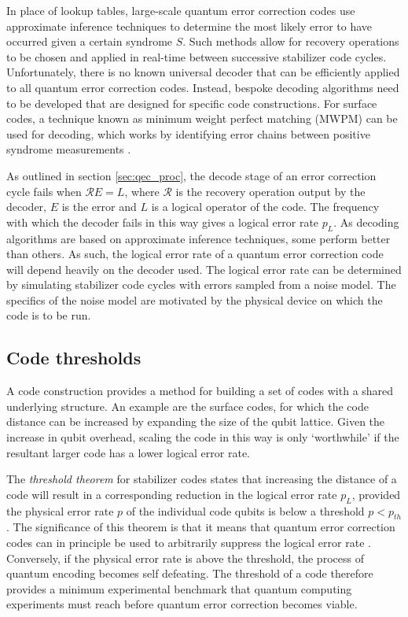 \documentclass[]{arxiv}
\theoremstyle{plain}%
\theoremstyle{definition}
\theoremstyle{remark}
\begin{document}
In place of lookup tables, large-scale quantum error correction codes use approximate inference techniques to determine the most likely error to have occurred given a certain syndrome $S$. Such methods allow for recovery operations to be chosen and applied in real-time between successive stabilizer code cycles. Unfortunately, there is no known universal decoder that can be efficiently applied to all quantum error correction codes. Instead, bespoke decoding algorithms need to be developed that are designed for specific code constructions. For surface codes, a technique known as minimum weight perfect matching (MWPM) can be used for decoding, which works by identifying error chains between positive syndrome measurements \cite{Edmonds65,Kolmogorov09}.

As outlined in section \ref{sec:qec_proc}, the decode stage of an error correction cycle fails when $\mathcal{R}E=L$, where $\mathcal{R}$ is the recovery operation output by the decoder, $E$ is the error and $L$ is a logical operator of the code. The frequency with which the decoder fails in this way gives a logical error rate $p_L$. As decoding algorithms are based on approximate inference techniques, some perform better than others. As such, the logical error rate of a quantum error correction code will depend heavily on the decoder used. The logical error rate can be determined by simulating stabilizer code cycles with errors sampled from a noise model. The specifics of the noise model are motivated by the physical device on which the code is to be run.


\subsection{Code thresholds}
A code construction provides a method for building a set of codes with a shared underlying structure. An example are the surface codes, for which the code distance can be increased by expanding the size of the qubit lattice. Given the increase in qubit overhead, scaling the code in this way is only `worthwhile' if the resultant larger code has a lower logical error rate.

The \textit{threshold theorem} for stabilizer codes states that increasing the distance of a code will result in a corresponding reduction in the logical error rate $p_L$, provided the physical error rate $p$ of the individual code qubits is below a threshold $p<p_{th}$. The significance of this theorem is that it means that quantum error correction codes can in principle be used to arbitrarily suppress the logical error rate \cite{Preskill385,Kitaev1997,Aharonov:1997:FQC:258533.258579,Knill1998,Gottesman98}. Conversely, if the physical error rate is above the threshold, the process of quantum encoding becomes self defeating. The threshold of a code therefore provides a minimum experimental benchmark that quantum computing experiments must reach before quantum error correction becomes viable.    
\end{document}
